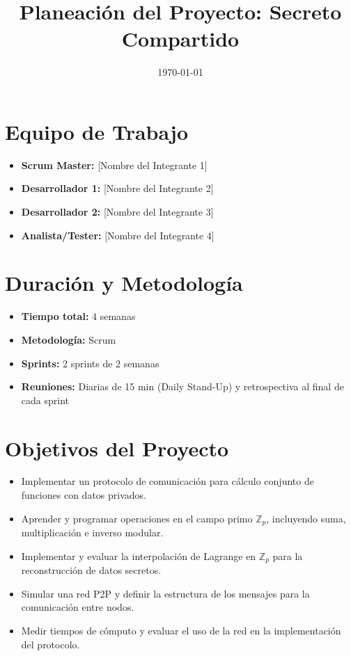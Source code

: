 \documentclass[a4paper,12pt]{article}
\title{\textbf{Planeación del Proyecto: Secreto Compartido}}
\author{}
\date{\today}
\begin{document}
\maketitle

\section*{Equipo de Trabajo}
\begin{itemize}
    \item \textbf{Scrum Master:} [Nombre del Integrante 1]
    \item \textbf{Desarrollador 1:} [Nombre del Integrante 2]
    \item \textbf{Desarrollador 2:} [Nombre del Integrante 3]
    \item \textbf{Analista/Tester:} [Nombre del Integrante 4]
\end{itemize}

\section*{Duración y Metodología}
\begin{itemize}
    \item \textbf{Tiempo total:} 4 semanas
    \item \textbf{Metodología:} Scrum
    \item \textbf{Sprints:} 2 sprints de 2 semanas
    \item \textbf{Reuniones:} Diarias de 15 min (Daily Stand-Up) y retrospectiva al final de cada sprint
\end{itemize}

\section*{Objetivos del Proyecto}
\begin{itemize}
    \item Implementar un protocolo de comunicación para cálculo conjunto de funciones con datos privados.
    \item Aprender y programar operaciones en el campo primo $\mathbb{Z}_p$, incluyendo suma, multiplicación e inverso modular.
    \item Implementar y evaluar la interpolación de Lagrange en $\mathbb{Z}_p$ para la reconstrucción de datos secretos.
    \item Simular una red P2P y definir la estructura de los mensajes para la comunicación entre nodos.
    \item Medir tiempos de cómputo y evaluar el uso de la red en la implementación del protocolo.
\end{itemize}
\end{document}
